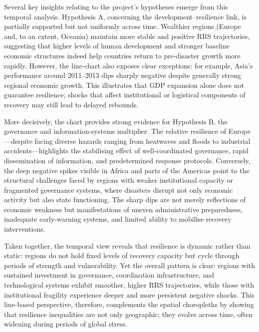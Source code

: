\documentclass[conference]{IEEEtran}
\begin{document}
Several key insights relating to the project’s hypotheses emerge from this temporal analysis. Hypothesis A, concerning the development–resilience link, is partially supported but not uniformly across time. Wealthier regions (Europe and, to an extent, Oceania) maintain more stable and positive RRS trajectories, suggesting that higher levels of human development and stronger baseline economic structures indeed help countries return to pre-disaster growth more rapidly. However, the line-chart also exposes clear exceptions: for example, Asia’s performance around 2011–2013 dips sharply negative despite generally strong regional economic growth. This illustrates that GDP expansion alone does not guarantee resilience; shocks that affect institutional or logistical components of recovery may still lead to delayed rebounds.

More decisively, the chart provides strong evidence for Hypothesis B, the governance and information-systems multiplier. The relative resilience of Europe—despite facing diverse hazards ranging from heatwaves and floods to industrial accidents—highlights the stabilising effect of well-coordinated governance, rapid dissemination of information, and predetermined response protocols. Conversely, the deep negative spikes visible in Africa and parts of the Americas point to the structural challenges faced by regions with weaker institutional capacity or fragmented governance systems, where disasters disrupt not only economic activity but also state functioning. The sharp dips are not merely reflections of economic weakness but manifestations of uneven administrative preparedness, inadequate early-warning systems, and limited ability to mobilise recovery interventions.

Taken together, the temporal view reveals that resilience is dynamic rather than static: regions do not hold fixed levels of recovery capacity but cycle through periods of strength and vulnerability. Yet the overall pattern is clear: regions with sustained investment in governance, coordination infrastructure, and technological systems exhibit smoother, higher RRS trajectories, while those with institutional fragility experience deeper and more persistent negative shocks. This line-based perspective, therefore, complements the spatial choropleths by showing that resilience inequalities are not only geographic; they evolve across time, often widening during periods of global stress.
\end{document}
